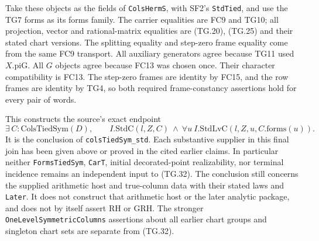 Take these objects as the fields of \texttt{ColsHermS}, with
SF2's \texttt{StdTied}, and use the TG7 forms as its forms
family. The carrier equalities are FC9 and TG10; all projection,
vector and rational-matrix equalities are (TG.20), (TG.25) and
their stated chart versions. The splitting equality and
step-zero frame equality come from the same FC9 transport.
All auxiliary generators agree because TG11 used
$X.\mathrm{piG}$. All $G$ objects agree because FC13 was chosen
once. Their character compatibility is FC13. The step-zero
frames are identity by FC15, and the row frames are identity
by TG4, so both required frame-constancy assertions hold for
every pair of words.

This constructs the source's exact endpoint
\[
 \exists\,C:\mathrm{ColsTiedSym}(D),\qquad
       I.\mathrm{StdC}(l,Z,C)\ \land\
       \forall u\ I.\mathrm{StdLvC}(l,Z,u,C.\mathrm{forms}(u)).
 \tag{TG.32}
\]
It is the conclusion of \texttt{colsTiedSym\_std}. Each
substantive supplier in this final join has been given above
or proved in the cited earlier claims. In particular neither
\texttt{FormsTiedSym}, \texttt{CarT}, initial decorated-point
realizability, nor terminal incidence remains an independent
input to (TG.32). The conclusion still concerns the supplied
arithmetic host and true-column data with their stated laws
and \texttt{Later}. It does not construct that arithmetic
host or the later analytic package, and does not by itself
assert RH or GRH. The stronger \texttt{OneLevelSymmetricColumns}
assertions about all earlier chart groups and singleton chart
sets are separate from (TG.32).

